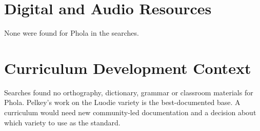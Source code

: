 \documentclass[12pt]{article}
\begin{document}
\section{Digital and Audio Resources}
None were found for Phola in the searches.

\section{Curriculum Development Context}
Searches found no orthography, dictionary, grammar or classroom materials for Phola. Pelkey's work on the Luodie variety is the best-documented base. A curriculum would need new community-led documentation and a decision about which variety to use as the standard.
\end{document}
